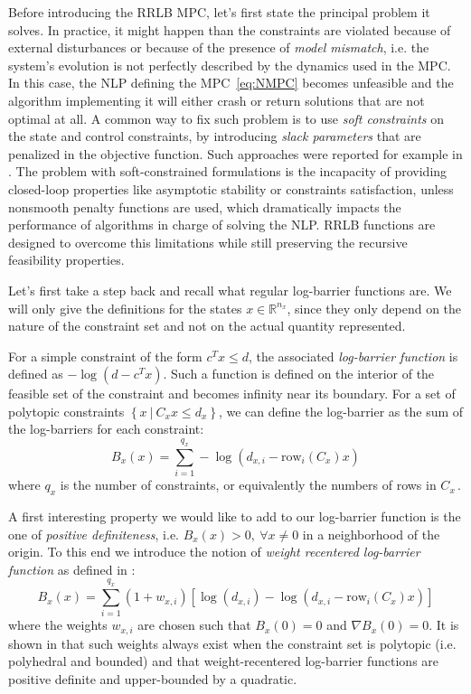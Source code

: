 \documentclass[journal]{IEEEtran}
\theoremstyle{definition}
\theoremstyle{remark}
\def\rm#1{\mathrm{#1}}
\newcommand{\R}{\mathbb{R}}
\begin{document}
Before introducing the RRLB MPC, let's first state the principal problem it solves.
In practice, it might happen than the constraints are violated because of external disturbances or because of the presence of \textit{model mismatch}, i.e. the system's evolution is not perfectly described by the dynamics used in the MPC.
In this case, the NLP defining the MPC~\ref{eq:NMPC} becomes unfeasible and the algorithm implementing it will either crash or return solutions that are not optimal at all.
A common way to fix such problem is to use \textit{soft constraints} on the state and control constraints, by introducing \textit{slack parameters} that are penalized in the objective function.
Such approaches were reported for example in \cite{soft-constrained-MPC}.
The problem with soft-constrained formulations is the incapacity of providing closed-loop properties like asymptotic stability or constraints satisfaction, unless nonsmooth penalty functions are used, which dramatically impacts the performance of algorithms in charge of solving the NLP.
RRLB functions are designed to overcome this limitations while still preserving the recursive feasibility properties.

\vspace{12pt}

Let's first take a step back and recall what regular log-barrier functions are.
We will only give the definitions for the states $x\in\R^{n_x}$, since they only depend on the nature of the constraint set and not on the actual quantity represented.

For a simple constraint of the form $c^Tx\leq d$, the associated \textit{log-barrier function} is defined as $-\log(d-c^Tx)$.
Such a function is defined on the interior of the feasible set of the constraint and becomes infinity near its boundary.
For a set of polytopic constraints $\left\{ x~|~C_xx\leq d_x \right\}$, we can define the log-barrier as the sum of the log-barriers for each constraint:
$$B_x(x)=\sum_{i=1}^{q_x}-\log(d_{x,i}-\rm{row}_i(C_x)x)$$
where $q_x$ is the number of constraints, or equivalently the numbers of rows in $C_x$\,.

A first interesting property we would like to add to our log-barrier function is the one of \textit{positive definiteness}, i.e. $B_x(x)>0,~\forall x\neq 0$ in a neighborhood of the origin.
To this end we introduce the notion of \textit{weight recentered log-barrier function} as defined in \cite{RLB}:
$$B_x(x)=\sum_{i=1}^{q_x}(1+w_{x,i})\left[\log(d_{x,i})-\log(d_{x,i}-\rm{row}_i(C_x)x)\right]$$
where the weights $w_{x,i}$ are chosen such that $B_x(0)=0$ and $\nabla B_x(0)=0$.
It is shown in \cite{RLB} that such weights always exist when the constraint set is polytopic (i.e. polyhedral and bounded) and that weight-recentered log-barrier functions are positive definite and upper-bounded by a quadratic.
\end{document}
